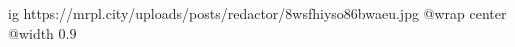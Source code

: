  
 
 
 
 

\ifcmt
  ig https://mrpl.city/uploads/posts/redactor/8wsfhiyso86bwaeu.jpg
  @wrap center
  @width 0.9
\fi
